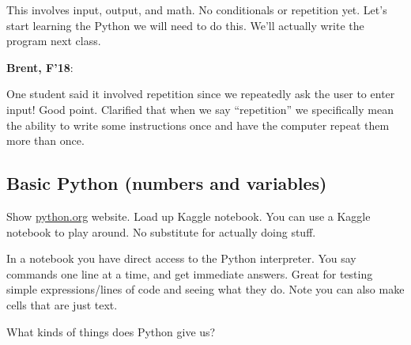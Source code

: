 \documentclass{article}
\newenvironment{reflect}[1]
{
  \noindent
  \begin{lrbox}{\reflectbox}
    \begin{minipage}[t]{\textwidth}
      \textbf{#1}:
}{
    \end{minipage}
  \end{lrbox}
  \fbox{\usebox{\reflectbox}}
}
\begin{document}
This involves input, output, and math.  No conditionals or repetition
yet.  Let's start learning the Python we will need to do this.  We'll
actually write the program next class.

\begin{reflect}{Brent, F'18}
  One student said it involved repetition since we repeatedly ask the
  user to enter input!  Good point.  Clarified that when we say
  ``repetition'' we specifically mean the ability to write some
  instructions once and have the computer repeat them more than once.
\end{reflect}

\subsection*{Basic Python (numbers and variables)}

Show \url{python.org} website.  Load up Kaggle notebook.  You can use
a Kaggle notebook to play around.  No substitute for actually doing
stuff.

In a notebook you have direct access to the Python interpreter.  You
say commands one line at a time, and get immediate answers.  Great for
testing simple expressions/lines of code and seeing what they do.
Note you can also make cells that are just text.

What kinds of things does Python give us?
\end{document}
